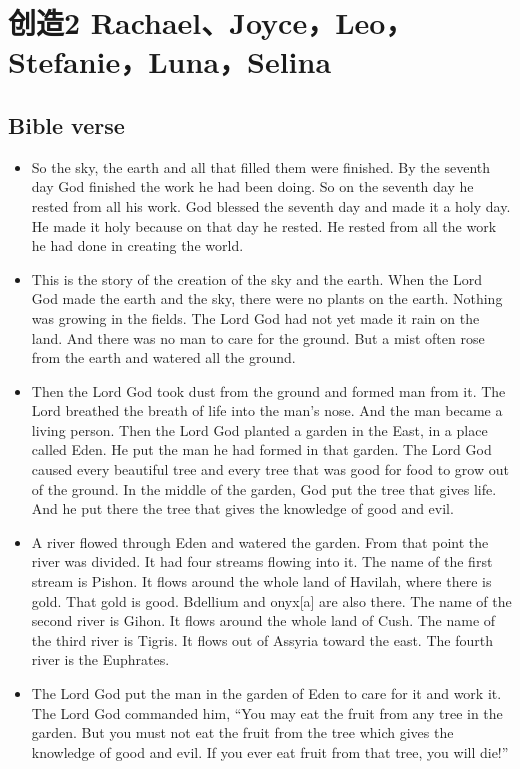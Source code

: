 
\chapter{创造2 Rachael、Joyce，Leo，Stefanie，Luna，Selina}

\section{Bible verse}
\begin{itemize}
\item So the sky, the earth and all that filled them were finished. By the seventh day God finished the work he had been doing. So on the seventh day he rested from all his work.  God blessed the seventh day and made it a holy day. He made it holy because on that day he rested. He rested from all the work he had done in creating the world.

\item This is the story of the creation of the sky and the earth. When the Lord God made the earth and the sky,  there were no plants on the earth. Nothing was growing in the fields. The Lord God had not yet made it rain on the land. And there was no man to care for the ground.  But a mist often rose from the earth and watered all the ground.

\item Then the Lord God took dust from the ground and formed man from it. The Lord breathed the breath of life into the man’s nose. And the man became a living person. Then the Lord God planted a garden in the East, in a place called Eden. He put the man he had formed in that garden. The Lord God caused every beautiful tree and every tree that was good for food to grow out of the ground. In the middle of the garden, God put the tree that gives life. And he put there the tree that gives the knowledge of good and evil.

\item A river flowed through Eden and watered the garden. From that point the river was divided. It had four streams flowing into it. The name of the first stream is Pishon. It flows around the whole land of Havilah, where there is gold. That gold is good. Bdellium and onyx[a] are also there. The name of the second river is Gihon. It flows around the whole land of Cush. The name of the third river is Tigris. It flows out of Assyria toward the east. The fourth river is the Euphrates.

\item The Lord God put the man in the garden of Eden to care for it and work it.  The Lord God commanded him, “You may eat the fruit from any tree in the garden. But you must not eat the fruit from the tree which gives the knowledge of good and evil. If you ever eat fruit from that tree, you will die!”


\end{itemize}
